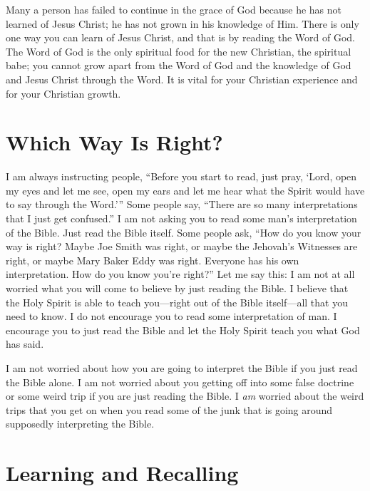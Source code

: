 Many a person has failed to continue in the grace of God 
because he has not learned of Jesus Christ; he has not grown 
in his knowledge of Him. There is only one way you can 
learn of Jesus Christ, and that is by reading the Word of 
God. The Word of God is the only spiritual food for the 
new Christian, the spiritual babe; you cannot grow apart 
from the Word of God and the knowledge of God and Jesus 
Christ through the Word. It is vital for your Christian experience and for your Christian growth.


\section*{Which Way Is Right?}

I am always instructing people, “Before you start to 
read, just pray, ‘Lord, open my eyes and let me see, open 
my ears and let me hear what the Spirit would have to say 
through the Word.’” Some people say, “There are so many 
interpretations that I just get confused.” I am not asking you 
to read some man’s interpretation of the Bible. Just read the 
Bible itself. Some people ask, “How do you know your way 
is right? Maybe Joe Smith was right, or maybe the Jehovah’s 
Witnesses are right, or maybe Mary Baker Eddy was right. 
Everyone has his own interpretation. How do you know 
you’re right?” Let me say this: I am not at all worried what 
you will come to believe by just reading the Bible. I believe 
that the Holy Spirit is able to teach you—right out of the 
Bible itself—all that you need to know. I do not encourage 
you to read some interpretation of man. I encourage you to 
just read the Bible and let the Holy Spirit teach you what 
God has said.

I am not worried about how you are going to interpret 
the Bible if you just read the Bible alone. I am not worried 
about you getting off into some false doctrine or some weird 
trip if you are just reading the Bible. I \emph{am} worried about the 
weird trips that you get on when you read some of the junk 
that is going around supposedly interpreting the Bible.


\section*{Learning and Recalling}

